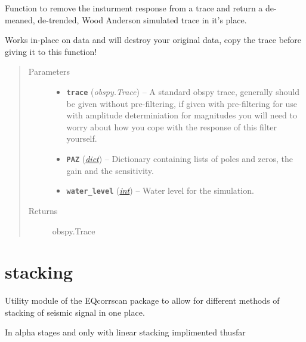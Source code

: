 \documentclass[a4paper,10pt,english]{sphinxmanual}
\begin{document}
\begin{fulllineitems}
\label{modules:mag_calc._sim_WA}
Function to remove the insturment response from a trace and return a
de-meaned, de-trended, Wood Anderson simulated trace in it's place.

Works in-place on data and will destroy your original data, copy the
trace before giving it to this function!
\begin{quote}\begin{description}
\item[{Parameters}] \leavevmode\begin{itemize}
\item {} 
\textbf{\texttt{trace}} (\emph{obspy.Trace}) -- A standard obspy trace, generally should be given without
pre-filtering, if given with pre-filtering for use with
amplitude determiniation for magnitudes you will need to
worry about how you cope with the response of this filter
yourself.

\item {} 
\textbf{\texttt{PAZ}} (\href{https://docs.python.org/library/stdtypes.html\#dict}{\emph{dict}}) -- Dictionary containing lists of poles and zeros, the gain and
the sensitivity.

\item {} 
\textbf{\texttt{water\_level}} (\href{https://docs.python.org/library/functions.html\#int}{\emph{int}}) -- Water level for the simulation.

\end{itemize}

\item[{Returns}] \leavevmode
obspy.Trace

\end{description}\end{quote}

\end{fulllineitems}



\section{stacking}
\label{modules:stacking}\label{modules:module-stacking}
Utility module of the EQcorrscan package to allow for different methods of
stacking of seismic signal in one place.

In alpha stages and only with linear stacking implimented thusfar
\end{document}

